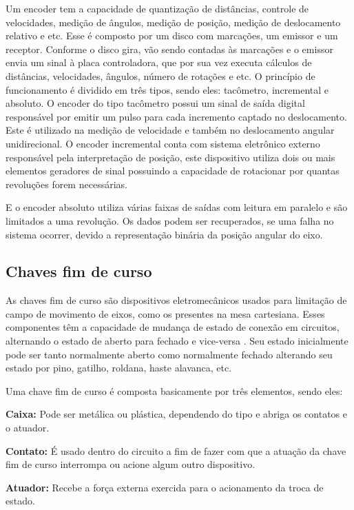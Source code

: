 Um encoder tem a capacidade de quantização de distâncias, controle de velocidades, medição de ângulos, 
medição de posição, medição de deslocamento relativo e etc. Esse é composto por um disco com marcações, 
um emissor e um receptor. Conforme o disco gira, vão sendo contadas às marcações e o emissor envia um sinal 
à placa controladora, que por sua vez executa cálculos de distâncias, velocidades, ângulos, número de rotações 
e etc. O princípio de funcionamento é dividido em três tipos, sendo eles: tacômetro, incremental e absoluto.
O encoder do tipo tacômetro possui um sinal de saída digital responsável por emitir um pulso para cada 
incremento captado no deslocamento. Este é utilizado na medição de velocidade e também no deslocamento 
angular unidirecional. O encoder incremental conta com sistema eletrônico externo responsável pela 
interpretação de posição, este dispositivo utiliza dois ou mais elementos geradores de sinal possuindo 
a capacidade de rotacionar por quantas revoluções forem necessárias.

E o encoder absoluto utiliza várias faixas de saídas com leitura em paralelo e são limitados a uma revolução. 
Os dados podem ser recuperados, se uma falha no sistema ocorrer, devido a representação binária da posição 
angular do eixo.

\subsection{Chaves fim de curso}\label{subsec:metchaves}

As chaves fim de curso são dispositivos eletromecânicos usados para limitação de campo de movimento de eixos, 
como os presentes na mesa cartesiana. Esses componentes têm a capacidade de mudança de estado de conexão 
em circuitos, alternando o estado de aberto para fechado e vice-versa \cite{alciatore2014introduccao}. 
Seu estado inicialmente pode ser tanto normalmente aberto como normalmente fechado alterando seu estado 
por pino, gatilho, roldana, haste alavanca, etc. 

Uma chave fim de curso é composta basicamente por três elementos, sendo eles:

\begin{alineas}
    \item \textbf{Caixa:} Pode ser metálica ou plástica, dependendo do tipo e abriga os contatos e o atuador.
    \item \textbf{Contato:} É usado dentro do circuito a fim de fazer com que a atuação da chave fim de curso interrompa ou 
    acione algum outro dispositivo.
    \item \textbf{Atuador:} Recebe a força externa exercida para o acionamento da troca de estado.
\end{alineas}

